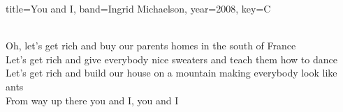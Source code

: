 \documentclass{../../tex/bekki-leadsheet}
\begin{document}
\begin{song}{title={You and I}, band={Ingrid Michaelson}, year={2008}, key={C}}
  \begin{outro}
     \\
    Oh, let’s get rich and buy our parents homes in the south of France \\
    Let's get rich and give everybody nice sweaters and teach them how to dance \\
    Let's get rich and build our house on a mountain making everybody look like ants \\
    From way up there you and I, you and I
  \end{outro}

\end{song}
\end{document}
